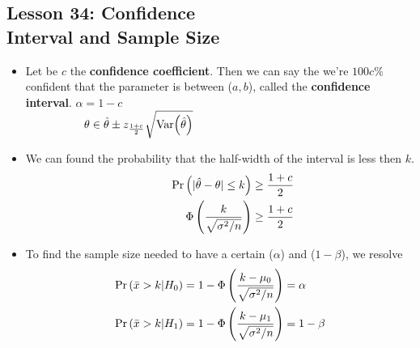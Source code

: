 \documentclass[10pt, french]{article}
\begin{document}
\begin{multicols*}{3}
\section*{Lesson 34: Confidence \\ Interval and Sample Size}
\begin{itemize}[align=left,leftmargin=*]
  \item Let be $c$ the \textbf{confidence coefficient}. Then we can say the we're $100c\%$ confident that the parameter is between ($a, b$), called the \textbf{confidence interval}. $\alpha = 1 - c$ \\
  $\hspace*{1.8cm} \theta \in \hat{\theta} \pm z_{\frac{1+c}{2}}\sqrt{\mathrm{Var} {\left( \hat{\theta} \right)}}$
  \item We can found the probability that the half-width of the interval is less then $k$.
  \begin{align*}
    \hspace*{0.8cm}
    \Pr \left( |\hat{\theta} - \theta| \leq k \right) &\geq \frac{1+c}{2} \\
    \Phi\left(\frac{k}{\sqrt{\sigma^2/n}}\right) &\geq \frac{1+c}{2}
  \end{align*}
  \item To find the sample size needed to have a certain ($\alpha$) and ($1 - \beta$), we resolve
  \begin{align*}
    \Pr \left( \bar{x}>k|H_0 \right) &= 1 - \Phi\left( \frac{k-\mu_{0}}{\sqrt{\sigma^2/n}} \right) = \alpha \\
    \Pr \left( \bar{x}>k|H_1 \right) &= 1 - \Phi\left( \frac{k-\mu_{1}}{\sqrt{\sigma^2/n}} \right) = 1 - \beta \\
  \end{align*}
\end{itemize}


\end{multicols*}
\end{document}
